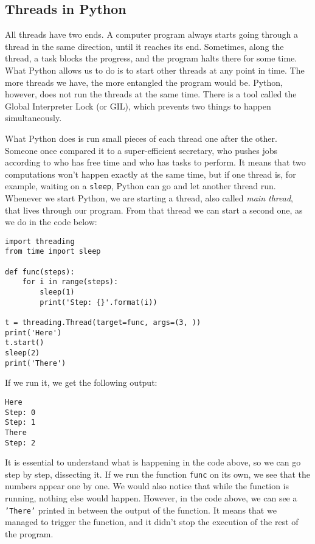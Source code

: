 \subsection{Threads in Python}\label{subsec:multithreading}
All threads have two ends. A computer program always starts going through a thread in the same direction, until it reaches its end. Sometimes, along the thread, a task blocks the progress, and the program halts there for some time. What Python allows us to do is to start other threads at any point in time. The more threads we have, the more entangled the program would be. Python, however, does not run the threads at the same time. There is a tool called the Global Interpreter Lock (or GIL), which prevents two things to happen simultaneously.

What Python does is run small pieces of each thread one after the other. Someone once compared it to a super-efficient secretary, who pushes jobs according to who has free time and who has tasks to perform. It means that two computations won't happen exactly at the same time, but if one thread is, for example, waiting on a \texttt{sleep}, Python can go and let another thread run. Whenever we start Python, we are starting a thread, also called \emph{main thread}, that lives through our program. From that thread we can start a second one, as we do in the code below:

\begin{verbatim}
import threading
from time import sleep

def func(steps):
    for i in range(steps):
        sleep(1)
        print('Step: {}'.format(i))

t = threading.Thread(target=func, args=(3, ))
print('Here')
t.start()
sleep(2)
print('There')
\end{verbatim}

If we run it, we get the following output:

\begin{verbatim}
Here
Step: 0
Step: 1
There
Step: 2
\end{verbatim}

It is essential to understand what is happening in the code above, so we can go step by step, dissecting it. If we run the function \texttt{func} on its own, we see that the numbers appear one by one. We would also notice that while the function is running, nothing else would happen. However, in the code above, we can see a \texttt{'There'} printed in between the output of the function. It means that we managed to trigger the function, and it didn't stop the execution of the rest of the program.

